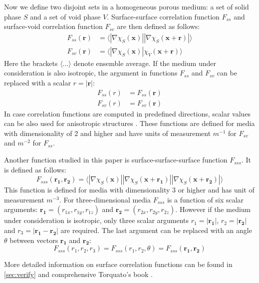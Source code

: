 \documentclass[reprint,amsmath,amssymb,aps,pre,showkeys,showpacs]{revtex4-1}
\begin{document}
Now we define two disjoint sets in a homogeneous porous medium: a set of solid
phase $S$ and a set of void phase $V$. Surface-surface correlation function
$F_{ss}$ and surface-void correlation function $F_{sv}$ are then defined as follows:
\begin{align}
  F_{ss}(\bm{r}) &= \langle |\nabla \chi_S(\bm{x})| |\nabla \chi_S(\bm{x} +
  \bm{r})| \rangle \label{eq:fss} \\
  F_{sv}(\bm{r}) &= \langle |\nabla \chi_S(\bm{x})| \chi_V(\bm{x} +
  \bm{r}) \rangle \label{eq:fsv}
\end{align}
Here the brackets $\langle \dots \rangle$ denote ensemble average. If the medium
under consideration is also isotropic, the argument in functions $F_{ss}$ and
$F_{sv}$ can be replaced with a scalar $r = |\bm{r}|$:
\begin{align*}
  F_{ss}(r) &= F_{ss}(\bm{r}) \\
  F_{sv}(r) &= F_{sv}(\bm{r})
\end{align*}
In case correlation functions are computed in predefined directions, scalar
values can be also used for anisotropic structures
\cite{jiao2014chawla,EPL1}. These functions are defined for media with
dimensionality of 2 and higher and have units of measurement $m^{-1}$ for
$F_{sv}$ and $m^{-2}$ for $F_{ss}$.

Another function studied in this paper is surface-surface-surface function
$F_{sss}$. It is defined as follows:
\begin{equation}
  F_{sss}(\bm{r_1}, \bm{r_2}) = \langle |\nabla \chi_S(\bm{x})|
  |\nabla \chi_S(\bm{x} + \bm{r_1})|
  |\nabla \chi_S(\bm{x} + \bm{r_2})|
  \rangle \label{eq:fsss}
\end{equation}
This function is defined for media with dimensionality 3 or higher and has unit
of measurement $m^{-3}$. For three-dimensional media $F_{sss}$ is a function of
six scalar arguments: $\bm{r_1} = (r_{1x}, r_{1y}, r_{1z})$ and
$\bm{r_2} = (r_{2x}, r_{2y}, r_{2z})$. However if the medium under consideration
is isotropic, only three scalar arguments $r_1 = |\bm{r_1}|$, $r_2 = |\bm{r_2}|$
and $r_3 = |\bm{r_1} - \bm{r_2}|$ are required. The last argument can be
replaced with an angle $\theta$ between vectors $\bm{r_1}$ and $\bm{r_2}$:
\begin{equation*}
  F_{sss}(r_1, r_2, r_3) = F_{sss}(r_1, r_2, \theta) = F_{sss}(\bm{r_1}, \bm{r_2})
\end{equation*}


More detailed information on surface correlation functions can be found in
\cref{sec:verify} and comprehensive Torquato's book \cite{Torquato_book}.
\end{document}
